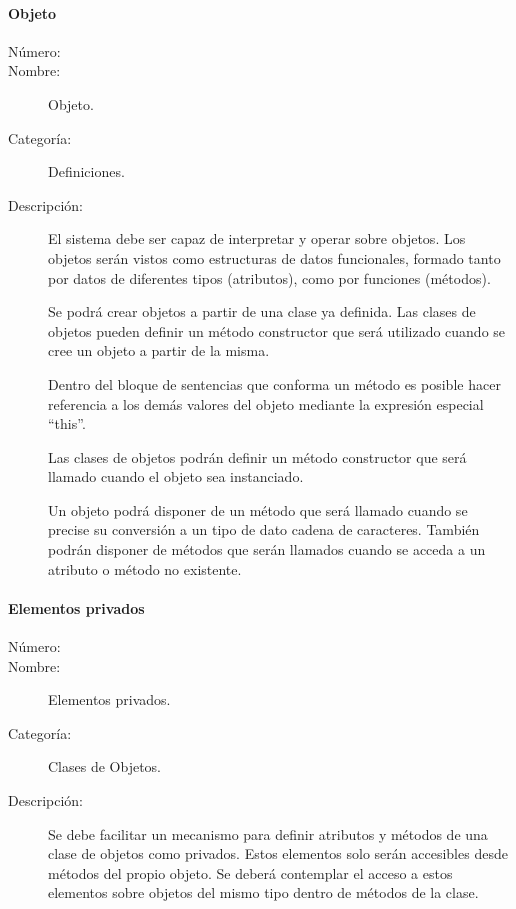 \paragraph{Objeto}
	\begin{description}
		\item [Número:] \cn
		\item [Nombre:] Objeto.
		\item [Categoría:] Definiciones.
		\item [Descripción:] El sistema debe ser capaz de interpretar y operar sobre objetos. Los objetos serán vistos
		como estructuras de datos funcionales, formado tanto por datos de diferentes tipos (atributos), como por funciones (métodos). 
      
      Se podrá crear objetos a partir de una clase ya definida. Las clases de objetos pueden definir un método constructor que será utilizado cuando se cree un objeto a partir de la misma. 
      
      Dentro del bloque de sentencias que conforma un método es posible hacer referencia a los demás valores del objeto mediante 
      la expresión especial ``this''.
      
      Las clases de objetos podrán definir un método constructor que será llamado cuando el objeto sea instanciado. 
      
      Un objeto podrá disponer de un método que será llamado cuando se precise su conversión a un tipo de dato cadena de caracteres. También podrán disponer de métodos que serán llamados cuando
se acceda a un atributo o método no existente.
	\end {description}

\paragraph{Elementos privados}
	\begin{description}
		\item [Número:] \cn
		\item [Nombre:] Elementos privados.
		\item [Categoría:] Clases de Objetos.
		\item [Descripción:] Se debe facilitar un mecanismo para definir atributos y métodos de una clase de objetos como privados. 
      Estos elementos solo serán accesibles desde métodos del propio objeto. Se deberá contemplar el acceso a estos elementos
      sobre objetos del mismo tipo dentro de métodos de la clase.
	\end{description}

